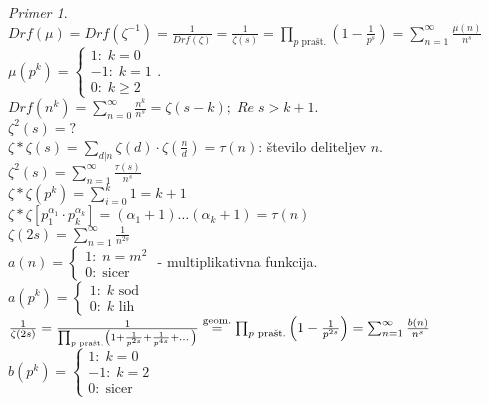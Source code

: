 \documentclass[a4paper, 12pt]{book}
\theoremstyle{definition}
\theoremstyle{remark}
\newtheorem*{ex}{Primer}
\begin{document}
\begin{ex} \text{} \\
  $Drf(\mu) = Drf(\zeta^{-1}) = \frac{1}{Drf(\zeta)} = \frac{1}{\zeta(s)} =
  \prod_{p \text{ prašt.}} \left(1 - \frac{1}{p^s}\right) = \sum_{n=1}^{\infty} \frac{\mu(n)}{n^s}$ \\
  $\mu\left(p^k\right) = \begin{cases}
    1: \; k = 0 \\
    -1: \; k = 1 \\
    0: \; k \geq 2
  \end{cases}$. \\
  $Drf\left(n^k\right) = \sum_{n=0}^{\infty} \frac{n^k}{n^s} = \zeta(s-k); \; Re \; s > k+1$. \\
  $\zeta^2(s) = ?$ \\
  $\zeta * \zeta(s) = \sum_{d | n} \zeta(d) \cdot \zeta\left(\frac{n}{d}\right) = \tau(n)$: število deliteljev $n$. \\
  $\zeta^2(s) = \sum_{n=1}^{\infty} \frac{\tau(s)}{n^s}$ \\
  $\zeta * \zeta(p^k) = \sum_{i=0}^{k} 1 = k+1$ \\
  $\zeta * \zeta\left[p_1^{\alpha_1} \cdot p_k^{\alpha_k}\right] = (\alpha_1 + 1) \dots (\alpha_k + 1) = \tau(n)$ \\
  $\zeta(2s) = \sum_{n=1}^{\infty} \frac{1}{n^{2s}}$ \\
  $a(n) = \begin{cases}
    1: \; n = m^2 \\
    0: \; \text{sicer}
  \end{cases}$ - multiplikativna funkcija. \\
  $a(p^k) = \begin{cases}
    1: \; k \text{ sod} \\
    0: \; k \text{ lih}
  \end{cases}$ \\
  $\frac{1}{\zeta(2s)} = \frac{1}{\prod_{p \text{ prašt.}} \left(1 + \frac{1}{p^{2s}} + \frac{1}{p^{4s}} + \dots\right)} \\
  \stackrel{\text{geom.}}{=} \prod_{p \text{ prašt.}} \left(1 - \frac{1}{p^{2s}}\right)
  = \sum_{n=1}^{\infty} \frac{b(n)}{n^s}$ \\
  $b(p^k) = \begin{cases}
    1: \; k = 0 \\
    -1: \; k = 2 \\
    0: \; \text{sicer}
  \end{cases}$ \\

\end{ex}
\end{document}
